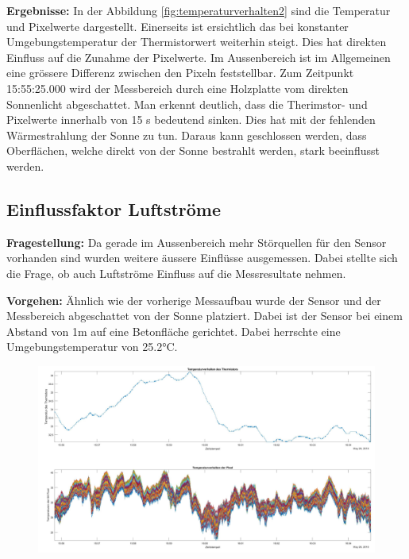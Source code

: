 \textbf{Ergebnisse:} In der Abbildung \ref{fig:temperaturverhalten2} sind die Temperatur und Pixelwerte dargestellt. Einerseits ist ersichtlich das bei konstanter Umgebungstemperatur der Thermistorwert weiterhin steigt. Dies hat direkten Einfluss auf die Zunahme der Pixelwerte. Im Aussenbereich ist im Allgemeinen eine grössere Differenz zwischen den Pixeln feststellbar.
Zum Zeitpunkt 15:55:25.000 wird der Messbereich durch eine Holzplatte vom direkten Sonnenlicht abgeschattet. Man erkennt deutlich, dass die Therimstor- und Pixelwerte innerhalb von 15 s bedeutend sinken. Dies hat mit der fehlenden Wärmestrahlung der Sonne zu tun. Daraus kann geschlossen werden, dass Oberflächen, welche direkt von der Sonne bestrahlt werden, stark beeinflusst werden.



\subsection{Einflussfaktor Luftströme}
\textbf{Fragestellung:} Da gerade im Aussenbereich mehr Störquellen für den Sensor vorhanden sind wurden weitere äussere Einflüsse ausgemessen. Dabei stellte sich die Frage, ob auch Luftströme Einfluss auf die Messresultate nehmen.

\textbf{Vorgehen:} Ähnlich wie der vorherige Messaufbau wurde der Sensor und der Messbereich abgeschattet von der Sonne platziert. Dabei ist der Sensor bei einem Abstand von 1m auf eine Betonfläche gerichtet. Dabei herrschte eine Umgebungstemperatur von 25.2°C.  
	
\begin{figure}[H]
	\centering
	\includegraphics[width=1.0\textwidth]{fig/Temperaturverhaltenwind}
	\caption{}
	\label{fig:temperaturverhaltenwind}
\end{figure}

